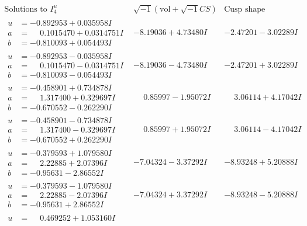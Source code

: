 \documentclass[1p]{elsarticle_modified}
\theoremstyle{definition}
\newcommand{\I}{\sqrt{-1}}
\begin{document}
$$\begin{array}{c|c|c}  
\text{Solutions to }I^u_{4}& \I (\text{vol} + \sqrt{-1}CS) & \text{Cusp shape}\\
 \hline 
\begin{aligned}
u &= -0.892953 + 0.035958 I \\
a &= \phantom{-}0.1015470 + 0.0314751 I \\
b &= -0.810093 + 0.054493 I\end{aligned}
 & -8.19036 + 4.73480 I & -2.47201 - 3.02289 I \\ \hline\begin{aligned}
u &= -0.892953 - 0.035958 I \\
a &= \phantom{-}0.1015470 - 0.0314751 I \\
b &= -0.810093 - 0.054493 I\end{aligned}
 & -8.19036 - 4.73480 I & -2.47201 + 3.02289 I \\ \hline\begin{aligned}
u &= -0.458901 + 0.734878 I \\
a &= \phantom{-}1.317400 + 0.329697 I \\
b &= -0.670552 - 0.262290 I\end{aligned}
 & \phantom{-}0.85997 - 1.95072 I & \phantom{-}3.06114 + 4.17042 I \\ \hline\begin{aligned}
u &= -0.458901 - 0.734878 I \\
a &= \phantom{-}1.317400 - 0.329697 I \\
b &= -0.670552 + 0.262290 I\end{aligned}
 & \phantom{-}0.85997 + 1.95072 I & \phantom{-}3.06114 - 4.17042 I \\ \hline\begin{aligned}
u &= -0.379593 + 1.079580 I \\
a &= \phantom{-}2.22885 + 2.07396 I \\
b &= -0.95631 - 2.86552 I\end{aligned}
 & -7.04324 - 3.37292 I & -8.93248 + 5.20888 I \\ \hline\begin{aligned}
u &= -0.379593 - 1.079580 I \\
a &= \phantom{-}2.22885 - 2.07396 I \\
b &= -0.95631 + 2.86552 I\end{aligned}
 & -7.04324 + 3.37292 I & -8.93248 - 5.20888 I \\ \hline\begin{aligned}
u &= \phantom{-}0.469252 + 1.053160 I \\

\end{aligned}
\end{array}$$
\end{document}
